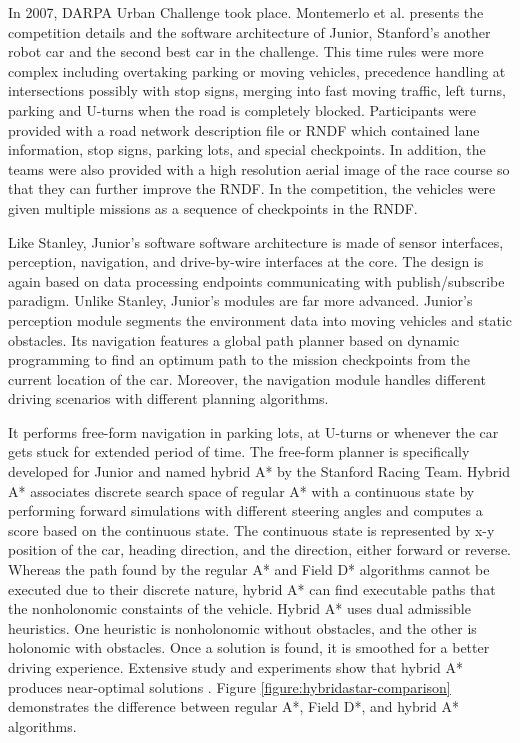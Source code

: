 In 2007, DARPA Urban Challenge took place. Montemerlo et al.
\cite{Montemerlo2009JuniorTS} presents the competition details and the software
architecture of Junior, Stanford's another robot car and the second best car in
the challenge. This time rules were more complex including overtaking parking
or moving vehicles, precedence handling at intersections possibly with stop
signs, merging into fast moving traffic, left turns, parking and U-turns when
the road is completely blocked. Participants were provided with a road network
description file or RNDF which contained lane information, stop signs, parking
lots, and special checkpoints. In addition, the teams were also provided with a
high resolution aerial image of the race course so that they can further
improve the RNDF. In the competition, the vehicles were given multiple missions
as a sequence of checkpoints in the RNDF.

Like Stanley, Junior's software software architecture is made of sensor
interfaces, perception, navigation, and drive-by-wire interfaces at the core.
The design is again based on data processing endpoints communicating with
publish/subscribe paradigm. Unlike Stanley, Junior's modules are far more
advanced. Junior's perception module segments the environment data into moving
vehicles and static obstacles. Its navigation features a global path planner
based on dynamic programming to find an optimum path to the mission checkpoints
from the current location of the car. Moreover, the navigation module handles
different driving scenarios with different planning algorithms.

It performs free-form navigation in parking lots, at U-turns or whenever the
car gets stuck for extended period of time. The free-form planner is
specifically developed for Junior and named hybrid A* by the Stanford Racing
Team. Hybrid A* associates discrete search space of regular A* with a
continuous state by performing forward simulations with different steering
angles and computes a score based on the continuous state. The continuous state
is represented by x-y position of the car, heading direction, and the
direction, either forward or reverse. Whereas the path found by the regular A*
and Field D* algorithms cannot be executed due to their discrete nature, hybrid
A* can find executable paths that the nonholonomic constaints of the vehicle.
Hybrid A* uses dual admissible heuristics. One heuristic is nonholonomic
without obstacles, and the other is holonomic with obstacles. Once a solution
is found, it is smoothed for a better driving experience. Extensive study and
experiments show that hybrid A* produces near-optimal solutions
\cite{Dolgov2010PathPF, Petereit2012Application}. Figure
\ref{figure:hybridastar-comparison} demonstrates the difference between regular
A*, Field D*, and hybrid A* algorithms.

